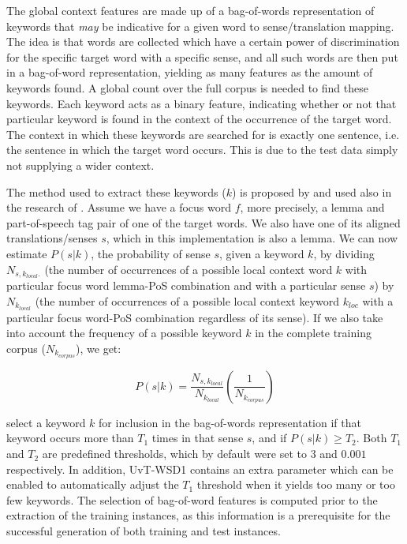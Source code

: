 The global context features are made up of a bag-of-words representation of
keywords that \emph{may} be indicative for a given word to sense/translation
mapping. The idea is that words are collected which have a certain power of
discrimination for the specific target word with a specific sense, and all such
words are then put in a bag-of-word representation, yielding as many features
as the amount of keywords found. A global count over the full corpus is needed
to find these keywords. Each keyword acts as a binary feature, indicating
whether or not that particular keyword is found in the context of the
occurrence of the target word. The context in which these keywords are searched
for is exactly one sentence, i.e. the sentence in which the target word occurs.
This is due to the test data simply not supplying a wider context.

The method used to extract these keywords ($k$) is proposed by \citep{NgL96} and
used also in the research of \citep{Hoste+02}. Assume we have a focus word $f$,
more precisely, a lemma and part-of-speech tag pair of one of the target words.
We also have one of its aligned translations/senses $s$, which in this
implementation is also a lemma. We can now estimate $P(s|k)$, the probability
of sense $s$, given a keyword $k$, by dividing $N_{s,k_{local}.}$ (the number
of occurrences of a possible local context word $k$ with particular focus word
lemma-PoS combination and with a particular sense $s$) by $N_{k_{local}}$ (the
number of occurrences of a possible local context keyword $k_{loc}$ with a
particular focus word-PoS combination regardless of its sense). If we also take
into account the frequency of a possible keyword $k$ in the complete training
corpus ($N_{k_{corpus}}$), we get:


\begin{equation}
P(s|k) = \frac{N_{s,k_{local}}}{N_{k_{local}}}(\frac{1}{N_{k_{corpus}}})
\end{equation}

\citep{Hoste+02} select a keyword $k$ for inclusion in the bag-of-words
representation if that keyword occurs more than $T_1$ times in that sense $s$,
and if $P(s|k) \ge T_2$. Both $T_1$ and $T_2$ are predefined thresholds, which
by default were set to $3$ and $0.001$ respectively. In addition, UvT-WSD1
contains an extra parameter which can be enabled to automatically adjust the
$T_1$ threshold when it yields too many or too few keywords. The selection of
bag-of-word features is computed prior to the extraction of the training
instances, as this information is a prerequisite for the successful generation
of both training and test instances.

